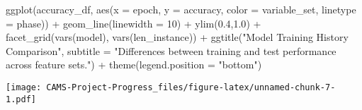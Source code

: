 \documentclass[
]{book}
\newenvironment{Shaded}{\begin{snugshade}}{\end{snugshade}}
\newcommand{\AttributeTok}[1]{\textcolor[rgb]{0.77,0.63,0.00}{#1}}
\newcommand{\DecValTok}[1]{\textcolor[rgb]{0.00,0.00,0.81}{#1}}
\newcommand{\FloatTok}[1]{\textcolor[rgb]{0.00,0.00,0.81}{#1}}
\newcommand{\FunctionTok}[1]{\textcolor[rgb]{0.00,0.00,0.00}{#1}}
\newcommand{\NormalTok}[1]{#1}
\newcommand{\SpecialCharTok}[1]{\textcolor[rgb]{0.00,0.00,0.00}{#1}}
\newcommand{\StringTok}[1]{\textcolor[rgb]{0.31,0.60,0.02}{#1}}
\begin{document}
\begin{Shaded}
\begin{Highlighting}[]
\FunctionTok{ggplot}\NormalTok{(accuracy\_df, }\FunctionTok{aes}\NormalTok{(}\AttributeTok{x =}\NormalTok{ epoch, }\AttributeTok{y =}\NormalTok{ accuracy, }\AttributeTok{color =}\NormalTok{ variable\_set, }\AttributeTok{linetype =}\NormalTok{ phase)) }\SpecialCharTok{+} 
  \FunctionTok{geom\_line}\NormalTok{(}\AttributeTok{linewidth =} \DecValTok{10}\NormalTok{) }\SpecialCharTok{+} 
  \FunctionTok{ylim}\NormalTok{(}\FloatTok{0.4}\NormalTok{,}\FloatTok{1.0}\NormalTok{) }\SpecialCharTok{+}
  \FunctionTok{facet\_grid}\NormalTok{(}\FunctionTok{vars}\NormalTok{(model), }\FunctionTok{vars}\NormalTok{(len\_instance)) }\SpecialCharTok{+}
  \FunctionTok{ggtitle}\NormalTok{(}\StringTok{"Model Training History Comparison"}\NormalTok{, }\AttributeTok{subtitle =} \StringTok{"Differences between training and test performance across feature sets."}\NormalTok{) }\SpecialCharTok{+} \FunctionTok{theme}\NormalTok{(}\AttributeTok{legend.position =} \StringTok{"bottom"}\NormalTok{)}
\end{Highlighting}
\end{Shaded}

\texttt{[image: CAMS-Project-Progress\_files/figure-latex/unnamed-chunk-7-1.pdf]}

  
\end{document}
